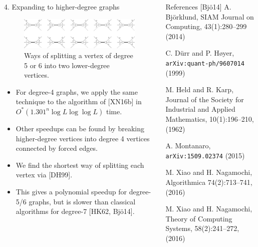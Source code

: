 \documentclass[]{templates/poster}
\begin{document}
\begin{frame}{}
\begin{columns}[t]
\begin{column}{0.422\linewidth}
  \begin{block}{\Large 4. Expanding to higher-degree graphs}
  \begin{figure}
  \includegraphics[width=\linewidth]{deg5}
  \caption{Ways of splitting a vertex of degree 5 or 6 into two lower-degree vertices.}
  \end{figure}

  \begin{itemize}
  \item For degree-4 graphs, we apply the same technique to the algorithm of [XN16b] in $O^*(1.301^n\log L \log\log L)$ time.
  
  \item Other speedups can be found by breaking higher-degree vertices into degree 4 vertices connected by forced edges.
  
  \item We find the shortest way of splitting each vertex via [DH99].

  \item This gives a polynomial speedup for degree-5/6 graphs, but is slower than classical algorithms for degree-7 [HK62, Bj\"o14].
  \end{itemize}
  \end{block}
  \end{column}

  \begin{column}{0.422\linewidth}
  \begin{block}{\Large References}
  [Bj\"o14] A. Bj{\"o}rklund, SIAM Journal on Computing, 43(1):280--299 (2014)

  \noindent[DH99] C. D\"urr and P. H\o yer, {\tt arXiv:quant-ph/9607014} (1999)

  \noindent[HK62] M. Held and R. Karp, Journal of the Society for Industrial and Applied Mathematics, 10(1):196--210, (1962)

  \noindent[Mon15] A. Montanaro, {\tt arXiv:1509.02374} (2015)

  \noindent[XN16a] M. Xiao and H. Nagamochi, Algorithmica 74(2):713--741, (2016)

  \noindent[XN16b] M. Xiao and H. Nagamochi, Theory of Computing Systems, 58(2):241--272, (2016)
  \end{block}
  \end{column}
\end{columns}

\end{frame}

\end{document}
